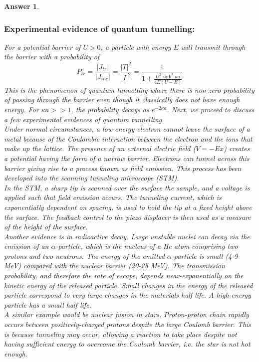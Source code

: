 \documentclass[a4paper]{article}
\newtheorem{ans}{Answer}[subsection]
\theoremstyle{new}
\begin{document}
\begin{ans}
\subsubsection*{Experimental evidence of quantum tunnelling:}
For a potential barrier of $U>0$, a particle with energy $E$ will transmit through the barrier with a probability of 
$$P_{tr}=\frac{|J_{tr}|}{|J_{inc}|}=\frac{|T|^2}{|I|^2}=\frac{1}{1+\frac{U^2\sinh^2\kappa a}{4E(U-E)}}$$
This is the phenomenon of quantum tunnelling where there is non-zero probability of passing through the barrier even though it classically does not have enough energy. For $\kappa a>>1$, the probability decays as $e^{-2\kappa a}$. Next, we proceed to discuss a few experimental evidences of quantum tunnelling.\\[5pt]
Under normal circumstances, a low-energy electron cannot leave the surface of a metal because of the Coulombic interaction between the electron and the ions that make up the lattice.
The presence of an external electric field ($V =-Ex$) creates a potential having the form of a narrow barrier. Electrons can tunnel across this barrier giving rise to a process known as field emission. This process has been developed into the scanning tunneling microscope (STM).\\[5pt]
In the STM, a sharp tip is scanned over the surface the sample, and a voltage is applied such that field emission occurs. The tunneling current, which is exponentially dependent on spacing, is used to hold the tip at a fixed height above the surface. The feedback control to the piezo displacer is then used as a measure of the height of the surface.\\[5pt]
Another evidence is in radioactive decay. Large unstable nuclei can decay via the emission of an $\alpha$-particle, which is the nucleus of a He atom comprising two protons and two neutrons. The energy of the emitted $\alpha$-particle is small (4-9 MeV) compared with the nuclear barrier (20-25 MeV). The transmission probability, and therefore the rate of escape, depends near-exponentially on the kinetic energy of the released particle. Small changes in the energy of the released particle correspond to very large changes in the materials half life. A high-energy particle has a small half life.\\[5pt]
A similar example would be nuclear fusion in stars. Proton-proton chain rapidly occurs between positively-charged protons despite the large Coulomb barrier. This is because tunneling may occur, allowing a reaction to take place despite not having sufficient energy to overcome the Coulomb barrier, i.e. the star is not hot enough.
\newpage

\end{ans}
\end{document}
